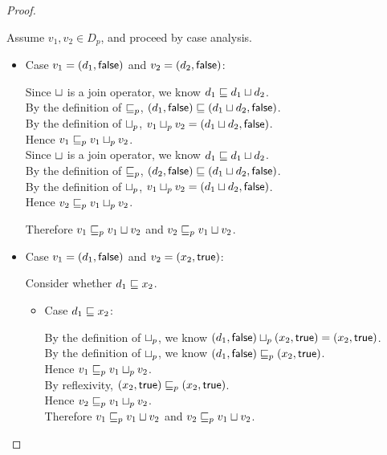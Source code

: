 \begin{proof}
\begin{enumerate}
\begin{enumerate}
    Assume $v_1, v_2 \in D_p$, and proceed by case analysis. 
    \begin{itemize}
      \item Case $v_1 = (d_1, \textsf{false})$ and $v_2 = (d_2, \textsf{false})$:

        Since $ \sqcup $ is a join operator, we know $d_1 \sqsubseteq d_1 \sqcup d_2$.\\
        By the definition of $\sqsubseteq_p$, $(d_1, \textsf{false}) \sqsubseteq (d_1 \sqcup d_2, \textsf{false})$.\\
        By the definition of $ \sqcup_p $, $v_1 \sqcup_p v_2 = (d_1 \sqcup d_2, \textsf{false})$.\\
        Hence $v_1 \sqsubseteq_p v_1 \sqcup_p v_2$.  \\

        Since $ \sqcup $ is a join operator, we know $d_1 \sqsubseteq d_1 \sqcup d_2$.\\
        By the definition of $\sqsubseteq_p$, $(d_2, \textsf{false}) \sqsubseteq (d_1 \sqcup d_2, \textsf{false})$.\\
        By the definition of $ \sqcup_p $, $v_1 \sqcup_p v_2 = (d_1 \sqcup d_2, \textsf{false})$.\\
        Hence $v_2 \sqsubseteq_p v_1 \sqcup_p v_2$. 

        Therefore $v_1 \sqsubseteq_p v_1  \sqcup  v_2$ and $v_2 \sqsubseteq_p v_1  \sqcup  v_2$. 
      \item Case $v_1 = (d_1, \textsf{false})$ and $v_2 = (x_2, \textsf{true})$:

        Consider whether $d_1 \sqsubseteq x_2$. 
        \begin{itemize}
          \item Case  $d_1 \sqsubseteq x_2$:

            By the definition of $ \sqcup_p $, we know $(d_1, \textsf{false})  \sqcup_p  (x_2, \textsf{true}) = (x_2, \textsf{true})$. \\ 
            By the definition of $ \sqcup_p $, we know $(d_1, \textsf{false}) \sqsubseteq_p (x_2, \textsf{true})$. \\ 
            Hence $v_1 \sqsubseteq_p v_1 \sqcup_p v_2$. \\ 
            By reflexivity, $(x_2, \textsf{true}) \sqsubseteq_p (x_2, \textsf{true})$. \\ 
            Hence $v_2 \sqsubseteq_p v_1 \sqcup_p v_2$. \\ 
            Therefore $v_1 \sqsubseteq_p v_1  \sqcup  v_2$ and $v_2 \sqsubseteq_p v_1  \sqcup  v_2$. 


\end{itemize}
\end{itemize}
\end{enumerate}
\end{enumerate}
\end{proof}
